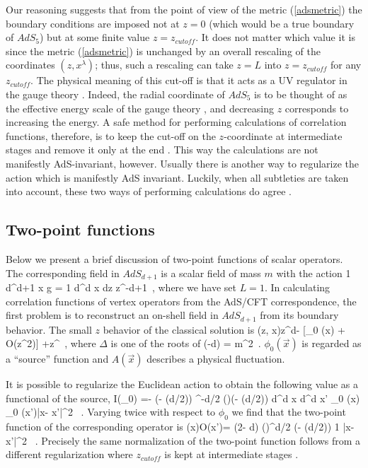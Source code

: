 Our reasoning suggests
that from the point of view of the metric (\ref{adsmetric})
the boundary conditions are imposed not at $z=0$ 
(which would be a true boundary 
of $AdS_5$) but at some finite value $z= z_{cutoff}$.
It does not matter which value it is since 
the metric (\ref{adsmetric}) is unchanged by an
overall rescaling of the coordinates $(z, x^{\lambda})$; thus,
such a rescaling can take $z=L$ into $z= z_{cutoff}$ for any
$z_{cutoff}$.
The physical meaning of this cut-off is that it acts as a UV
regulator in the gauge theory \cite{US,sw}. Indeed, the radial coordinate of
$AdS_5$ is to be thought of as the effective energy scale of the gauge
theory \cite{jthroat}, and decreasing $z$ corresponds to increasing
the energy. 
A safe method for performing calculations of correlation
functions, therefore, is
to keep the cut-off on the $z$-coordinate at intermediate stages
and remove it only at the end \cite{US,freed}. This way the calculations are
not manifestly AdS-invariant, however. Usually there is another way to
regularize the action which is manifestly AdS invariant. Luckily, when
all subtleties are taken into account, these two ways of performing 
calculations do agree \cite{KWnew,Haro}.

\subsection{Two-point functions}

Below we present a brief discussion of two-point functions
of scalar operators. The corresponding field in $AdS_{d+1}$ is a scalar
field of mass $m$ with the action
\be
{1} \int d^{d+1} x \sqrt g
=
{1} \int d^d x dz  z^{-d+1}
\ ,
\ee
where we have set $L=1$.
In calculating correlation functions of vertex
operators from the AdS/CFT correspondence,
the first problem is to reconstruct an on-shell field in $AdS_{d+1}$
from its boundary behavior. 
The small $z$ behavior of the classical solution is
\be \label{bc}
\phi (z, \vec x)\rightarrow z^{d-\Delta}
[\phi_0 (\vec x) + O(z^2)]
+z^\Delta [A(\vec x) + O(z^2)] \ ,
\ee
where $\Delta$ is one of the roots of
\be \label{relation}
\Delta (\Delta -d) = m^2\ .
\ee
$\phi_0 (\vec x)$ is regarded as a ``source'' function and
$A(\vec x)$
describes a physical fluctuation.

It is possible to regularize the Euclidean
action \cite{KWnew}
to obtain the following value as a functional of the source,
\be
I(\phi_0) =- (\Delta- (d/2)) \pi^{-d/2}
{\Gamma (\Delta)\over \Gamma (\Delta-
(d/2))}
\int d^d \vec x \int d^d \vec x'
{\phi_0 (\vec x) \phi_0 (\vec x')\over |\vec x- \vec x'|^{2\Delta} }
\ .
\ee
Varying twice with respect to $\phi_0$ we find that the two-point
function of the corresponding operator is
\be \label{twopoint}
(\vec x){\cal  O}(\vec x')\rangle=
{(2\Delta - d) \Gamma (\Delta)\over \pi^{d/2} \Gamma (\Delta -
(d/2))} {1\over
|\vec x- \vec x'|^{2\Delta} }
\ .
\ee
Precisely the same normalization of the two-point function follows from a
different regularization where $z_{cutoff}$ is kept at intermediate stages
\cite{US,freed}.

